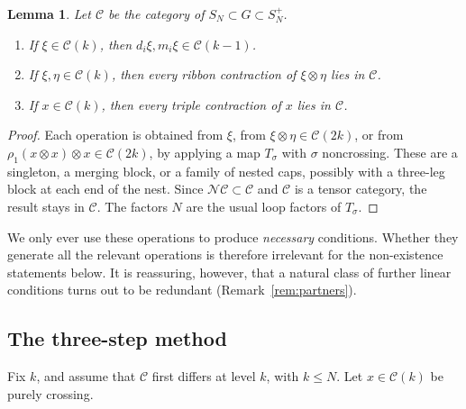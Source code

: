 \documentclass[11pt]{amsart}
\newtheorem{lemma}[theorem]{Lemma}
\theoremstyle{definition}
\theoremstyle{remark}
\theoremstyle{plain}
\numberwithin{equation}{section}
\numberwithin{table}{section}
\newcommand{\NC}{\mathcal{NC}}
\begin{document}
\begin{lemma}\label{lem:ops}
Let $\mathcal C$ be the category of $S_N\subset G\subset S_N^+$.
\begin{enumerate}
\item If $\xi\in\mathcal C(k)$, then $d_i\xi,m_i\xi\in\mathcal C(k-1)$.
\item If $\xi,\eta\in\mathcal C(k)$, then every ribbon contraction of $\xi\otimes\eta$ lies in $\mathcal C$.
\item If $x\in\mathcal C(k)$, then every triple contraction of $x$ lies in $\mathcal C$.
\end{enumerate}
\end{lemma}

\begin{proof}
Each operation is obtained from $\xi$, from $\xi\otimes\eta\in\mathcal C(2k)$, or from $\rho_1(x\otimes x)\otimes x\in\mathcal C(2k)$, by applying a map $T_\sigma$ with $\sigma$ noncrossing. These are a singleton, a merging block, or a family of nested caps, possibly with a three-leg block at each end of the nest. Since $\NC\subset\mathcal C$ and $\mathcal C$ is a tensor category, the result stays in $\mathcal C$. The factors $N$ are the usual loop factors of $T_\sigma$.
\end{proof}

We only ever use these operations to produce \emph{necessary} conditions. Whether they generate all the relevant operations is therefore irrelevant for the non-existence statements below. It is reassuring, however, that a natural class of further linear conditions turns out to be redundant (Remark~\ref{rem:partners}).

\subsection{The three-step method}

Fix $k$, and assume that $\mathcal C$ first differs at level $k$, with $k\le N$. Let $x\in\mathcal C(k)$ be purely crossing.
\end{document}
